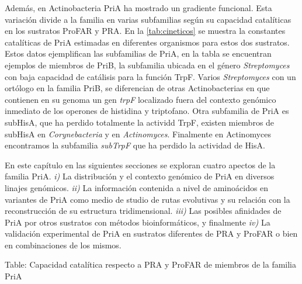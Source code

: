 \documentclass[12pt,twoside]{reedthesis}
\begin{document}
  Además, en Actinobacteria PriA ha mostrado un gradiente funcional. Esta
  variación divide a la familia en varias subfamilias según su capacidad
  catalíticas en los sustratos ProFAR y PRA. En la \autoref{tab:cineticos}
  se muestra la constantes catalíticas de PriA estimadas en diferentes
  organismos para estos dos sustratos. Estos datos ejemplifican las
  subfamilias de PriA, en la tabla se encuentran ejemplos de miembros de
  PriB, la subfamilia ubicada en el género \emph{Streptomyces} con baja
  capacidad de catálisis para la función TrpF. Varios \emph{Streptomyces}
  con un ortólogo en la familia PriB, se diferencian de otras
  Actinobacterias en que contienen en su genoma un gen \emph{trpF}
  localizado fuera del contexto genómico inmediato de los operones de
  histidina y triptofano. Otra subfamilia de PriA es subHisA, que ha
  perdido totalmente la actividd TrpF, existen miembros de subHisA en
  \emph{Corynebacteria} y en \emph{Actinomyces}. Finalmente en Actinomyces
  encontramos la subfamilia \emph{subTrpF} que ha perdido la actividad de
  HisA.
  
  En este capítulo en las siguientes secciones se exploran cuatro apectos
  de la familia PriA. \emph{i)} La distribución y el contexto genómico de
  PriA en diversos linajes genómicos. \emph{ii)} La información contenida
  a nivel de aminoácidos en variantes de PriA como medio de studio de
  rutas evolutivas y su relación con la reconstrucción de su estructura
  tridimensional. \emph{iii)} Las posibles afinidades de PriA por otros
  sustratos con métodos bioinformáticos, y finalmente \emph{iv)} La
  validación experimental de PriA en sustratos diferentes de PRA y ProFAR
  o bien en combinaciones de los mismos.
  
  Table: Capacidad catalítica respecto a PRA y ProFAR de miembros de la
  familia PriA \label{tab:cineticos}\\
  \clearpage    
  
\end{document}
